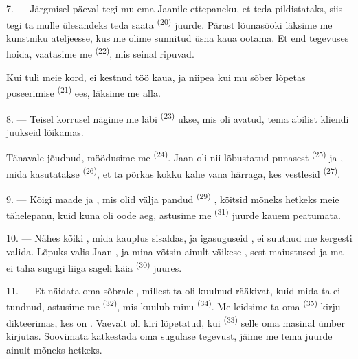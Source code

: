 \VUsaut{3.0mm}

7. --- Järgmisel päeval tegi mu ema Jaanile ettepaneku, et teda pildistataks, siis
tegi ta mulle ülesandeks teda saata  \textsuperscript{(20)} juurde.
Pärast lõunasööki läksime me kunstniku ateljeesse, kus me olime sunnitud üsna kaua
ootama. Et end tegevuses hoida, vaatasime me  \textsuperscript{(22)},
mis seinal ripuvad.

Kui tuli meie kord, ei kestnud töö kaua, ja niipea kui mu sõber lõpetas poseerimise
 \textsuperscript{(21)} ees, läksime me alla.

8. --- Teisel korrusel nägime me läbi  \textsuperscript{(23)} ukse, mis
oli avatud, tema abilist kliendi juukseid lõikamas.

Tänavale jõudnud, möödusime me  \textsuperscript{(24)}. Jaan oli nii
lõbustatud punasest  \textsuperscript{(25)} ja ,
mida kasutatakse  \textsuperscript{(26)}, et ta põrkas kokku kahe vana
härraga, kes vestlesid  \textsuperscript{(27)}.

\VUsaut{3.0mm}

9. --- Kõigi maade  ja , mis olid välja pandud
 \textsuperscript{(29)} , köitsid mõneks hetkeks
meie tähelepanu, kuid kuna oli oode aeg, astusime me 
\textsuperscript{(31)} juurde kauem peatumata.

10. --- Nähes kõiki , mida kauplus sisaldas,  ja igasuguseid , ei suutnud me kergesti valida.
Lõpuks valis Jaan , ja mina võtsin ainult väikese
, sest maiustused  ja ma ei taha
sugugi liiga sageli käia  \textsuperscript{(30)} juures.

\VUsaut{3.0mm}

11. --- Et näidata oma sõbrale , millest ta oli kuulnud
rääkivat, kuid mida ta ei tundnud, astusime me  \textsuperscript{(32)},
mis kuulub minu  \textsuperscript{(34)}. Me leidsime ta oma 
\textsuperscript{(35)} kirju dikteerimas, kes on . Vaevalt oli kiri
lõpetatud, kui  \textsuperscript{(33)} selle oma masinal ümber
kirjutas. Soovimata katkestada oma sugulase tegevust, jäime me tema juurde ainult
mõneks hetkeks.

